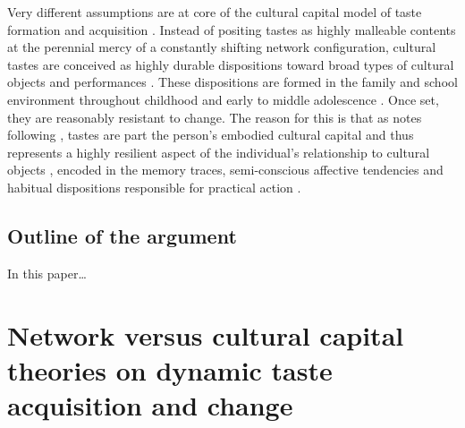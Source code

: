 \documentclass[11pt]{article}
\begin{document}
Very different assumptions are at core of the cultural capital model of taste formation and acquisition \citep{bourdieu84, holt98, lizardo06a}. Instead of positing tastes as highly malleable contents at the perennial mercy of a constantly shifting network configuration, cultural tastes are conceived as highly durable dispositions toward broad types of cultural objects and performances \citep{frith98}.  These dispositions are formed in the family and school environment throughout childhood and early to middle adolescence \citep{smith95}.  Once set, they are reasonably resistant to change.  The reason for this is that as \citep{holt97} notes following \citet{bourdieu86}, tastes are part the person's embodied cultural capital and thus represents a highly resilient aspect of the individual's relationship to cultural objects \citep{bourdieu84}, encoded in the memory traces, semi-conscious affective tendencies and habitual dispositions responsible for practical action \citep{bourdieu90a}.

\subsection{Outline of the argument}
In this paper{\ldots} 

\section{Network versus cultural capital theories on dynamic taste acquisition and change}
\label{sec:net-vs-cult}




\end{document}
